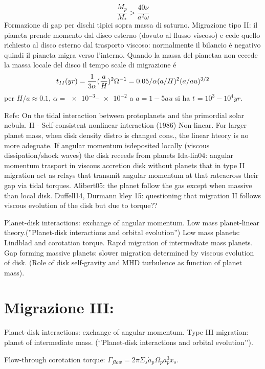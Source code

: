 \begin{workout}
\begin{workout}
\begin{equation}
\frac{M_p}{M_*}>\frac{40\nu}{a^2\omega}
\end{equation}
Formazione di gap per dischi tipici sopra massa di saturno.
Migrazione tipo II: il pianeta prende momento dal disco esterno (dovuto al flusso viscoso) e cede quello richiesto al disco esterno dal trasporto viscoso: normalmente il bilancio \'e negativo quindi il pianeta migra verso l'interno.
Quando la massa del pianetaa non eccede la massa locale del disco il tempo scale di migrazione \'e
\begin{equation}
t_{II}(yr)=\frac{1}{3\alpha}(\frac{a}{H})^2\Omega^{-1}=0.05/\alpha(a/H)^2(a/au)^{3/2}
\end{equation}
per $H/a\approx0.1$, $\alpha=\numrange{e-3}{e-2}$ a $a=1-5 au$ si ha $t_{}=10^3-10^4yr$.
\end{workout}

Refs: On the tidal interaction between protoplanets and the primordial solar nebula. II - Self-consistent nonlinear interaction (1986)
Non-linear. For larger planet mass, when disk density distro is changed cons., the linear hteory is no more adeguate. If angular momentum isdeposited locally (viscous dissipation/shock waves)  the disk receeds from planets
Ida-lin04: angular momentum trasport in viscous accretion disk without planets that in type II migration act as relays that transmit angular momentum at that rateacross their gap via tidal torques.
Alibert05: the planet follow the gas except when massive than local disk.
Duffell14, Durmann kley 15: questioning that migration II follows viscous evolution of the disk but due to torque??


Planet-disk interactions: exchange of angular momentum. Low mass planet-linear theory.(''Planet-disk interactions and orbital evolution'')
Low mass planets: Lindblad and corotation torque. Rapid migration of intermediate mass planets. Gap forming massive planets: slower migration determined by viscous evolution of disk. (Role of disk self-gravity and MHD turbulence as function of planet mass).


\section{Migrazione III:}
Planet-disk interactions: exchange of angular momentum. Type III migration: planet of intermediate mass. (‘’Planet-disk interactions and orbital evolution’’).

Flow-through corotation torque: $\Gamma_{flow}=2\pi\Sigma_s\dot{a}_p\Omega_pa_p^3x_s$.


\end{workout}
